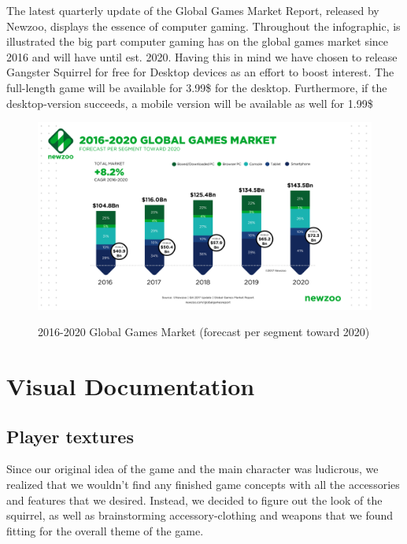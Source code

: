 \documentclass[12p]{article}
\begin{document}
The latest quarterly update of the Global Games Market Report, released by Newzoo, displays the essence of computer gaming. Throughout the infographic, is illustrated the big part computer gaming has on the global games market since 2016 and will have until est. 2020. Having this in mind we have chosen to release Gangster Squirrel for free for Desktop devices as an effort to boost interest. The full-length game will be available for 3.99\$ for the desktop. Furthermore, if the desktop-version succeeds, a mobile version will be available as well for 1.99\$

\begin{figure}[ht]
 \center
 \includegraphics[width=1\textwidth]{BusinessStrategy/GlobalGamesMarket2016-2020.png}
 \label{GlobalGamesMarket2016-2020}
 \caption{2016-2020 Global Games Market (forecast per segment toward 2020) \cite{GlobalGamesMarket}}
\end{figure}


\clearpage
\section{Visual Documentation} \label{VisualDocumentation}

\subsection{Player textures} \label{DocVisualPlayerTextures}

Since our original idea of the game and the main character was ludicrous, we realized that we wouldn’t find any finished game concepts with all the accessories and features that we desired. Instead, we decided to figure out the look of the squirrel, as well as brainstorming accessory-clothing and weapons that we found fitting for the overall theme of the game.
\end{document}
